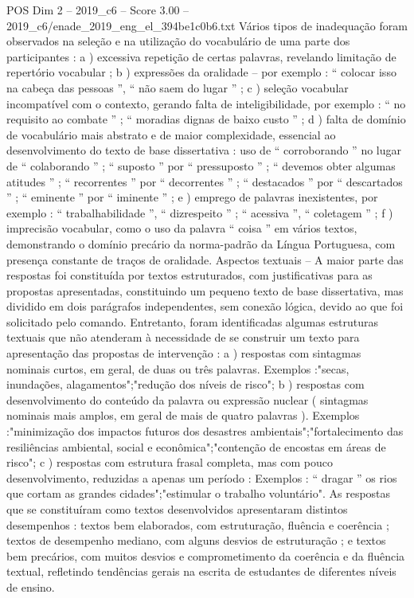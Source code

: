 \begin{textsample}{POS Dim 2 – 2019\_c6 – Score 3.00 – 2019\_c6/enade\_2019\_eng\_el\_394be1c0b6.txt}
Vários tipos de inadequação foram observados na seleção e na utilização do vocabulário de uma parte dos participantes : a ) excessiva repetição de certas palavras, revelando limitação de repertório vocabular ; b ) expressões da oralidade – por exemplo : “ colocar isso na cabeça das pessoas ”, “ não saem do lugar ” ; c ) seleção vocabular incompatível com o contexto, gerando falta de inteligibilidade, por exemplo : “ no requisito ao combate ” ; “ moradias dignas de baixo custo ” ; d ) falta de domínio de vocabulário mais abstrato e de maior complexidade, essencial ao desenvolvimento do texto de base dissertativa : uso de “ corroborando ” no lugar de “ colaborando ” ; “ suposto ” por “ pressuposto ” ; “ devemos obter algumas atitudes ” ; “ recorrentes ” por “ decorrentes ” ; “ destacados ” por “ descartados ” ; “ eminente ” por “ iminente ” ; e ) emprego de palavras inexistentes, por exemplo : “ trabalhabilidade ”, “ dizrespeito ” ; “ acessiva ”, “ coletagem ” ; f ) imprecisão vocabular, como o uso da palavra “ coisa ” em vários textos, demonstrando o domínio precário da norma-padrão da Língua Portuguesa, com presença constante de traços de oralidade.
Aspectos textuais – A maior parte das respostas foi constituída por textos estruturados, com justificativas para as propostas apresentadas, constituindo um pequeno texto de base dissertativa, mas dividido em dois parágrafos independentes, sem conexão lógica, devido ao que foi solicitado pelo comando.
Entretanto, foram identificadas algumas estruturas textuais que não atenderam à necessidade de se construir um texto para apresentação das propostas de intervenção : a ) respostas com sintagmas nominais curtos, em geral, de duas ou três palavras.
Exemplos :"secas, inundações, alagamentos";"redução dos níveis de risco"; b ) respostas com desenvolvimento do conteúdo da palavra ou expressão nuclear ( sintagmas nominais mais amplos, em geral de mais de quatro palavras ).
Exemplos :"minimização dos impactos futuros dos desastres ambientais";"fortalecimento das resiliências ambiental, social e econômica";"contenção de encostas em áreas de risco"; c ) respostas com estrutura frasal completa, mas com pouco desenvolvimento, reduzidas a apenas um período : Exemplos : “ dragar ” os rios que cortam as grandes cidades";"estimular o trabalho voluntário".
As respostas que se constituíram como textos desenvolvidos apresentaram distintos desempenhos : textos bem elaborados, com estruturação, fluência e coerência ; textos de desempenho mediano, com alguns desvios de estruturação ; e textos bem precários, com muitos desvios e comprometimento da coerência e da fluência textual, refletindo tendências gerais na escrita de estudantes de diferentes níveis de ensino.

\end{textsample}
